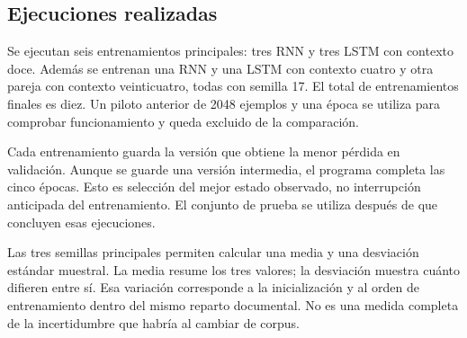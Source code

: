 \subsection{Ejecuciones realizadas}
Se ejecutan seis entrenamientos principales: tres RNN y tres LSTM con contexto doce. Además se entrenan una RNN y una LSTM con contexto cuatro y otra pareja con contexto veinticuatro, todas con semilla 17. El total de entrenamientos finales es diez. Un piloto anterior de 2048 ejemplos y una época se utiliza para comprobar funcionamiento y queda excluido de la comparación.

Cada entrenamiento guarda la versión que obtiene la menor pérdida en validación. Aunque se guarde una versión intermedia, el programa completa las cinco épocas. Esto es selección del mejor estado observado, no interrupción anticipada del entrenamiento. El conjunto de prueba se utiliza después de que concluyen esas ejecuciones.

Las tres semillas principales permiten calcular una media y una desviación estándar muestral. La media resume los tres valores; la desviación muestra cuánto difieren entre sí. Esa variación corresponde a la inicialización y al orden de entrenamiento dentro del mismo reparto documental. No es una medida completa de la incertidumbre que habría al cambiar de corpus.
